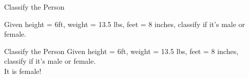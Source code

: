 \documentclass{beamer}
\begin{document}
\begin{frame}{Classify the Person}

    Given height = 6ft, weight = 13.5 lbs, feet = 8 inches, classify if it's male or female.
    
\end{frame}

\begin{frame}{Classify the Person}
    Given height = 6ft, weight = 13.5 lbs, feet = 8 inches, classify if it's male or female.\\
    It is female!
\end{frame}









\end{document}
